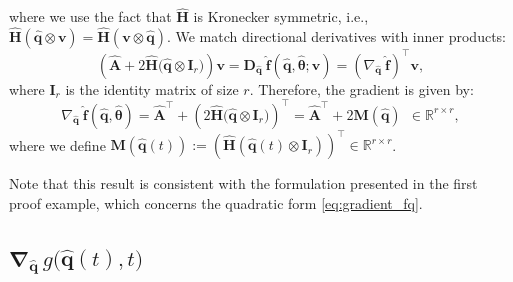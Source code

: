 where we use the fact that $\hat{\mathbf{H}}$ is Kronecker symmetric, i.e., $\hat{\mathbf{H}}(\hat{\mathbf{q}} \otimes \mathbf{v}) = \hat{\mathbf{H}}(\mathbf{v} \otimes \hat{\mathbf{q}})$.
We match directional derivatives with inner products:\\
$$
\left( \hat{\mathbf{A}} + 2\hat{\mathbf{H}}\bigl( \hat{\mathbf{q}} \otimes \mathbf{I}_r \bigr) \right) \mathbf{v} = \bm{D}_{\hat{\mathbf{q}}}~\hat{\mathbf{f}}(\hat{\mathbf{q}},\hat{\bm{\theta}};\mathbf{v}) = \left( \nabla_{\hat{\mathbf{q}}}~\hat{\mathbf{f}} \right)^{\top}  \mathbf{v},
$$
where $\mathbf{I}_r$ is the identity matrix of size $r$. Therefore, the gradient is given by:\\
\begin{equation}
    \nabla_{\hat{\mathbf{q}}}~\hat{\mathbf{f}}(\hat{\mathbf{q}}, \hat{\bm{\theta}}) = \hat{\mathbf{A}}^{\top} + \left( 2\hat{\mathbf{H}}\bigl( \hat{\mathbf{q}} \otimes \mathbf{I}_r \bigr) \right)^{\top} = \hat{\mathbf{A}}^{\top} + 2\mathbf{M}(\hat{\mathbf{q}}) ~~ \in \mathbb{R}^{r \times r},
    \label{eq:gradient_1}
\end{equation}
where we define $\mathbf{M}(\hat{\mathbf{q}}(t)) := \left( \hat{\mathbf{H}}( \hat{\mathbf{q}}(t) \otimes \mathbf{I}_r ) \right)^{\top} \in \mathbb{R}^{r \times r}$.

Note that this result is consistent with the formulation presented in the first proof example, which concerns the quadratic form \eqref{eq:gradient_fq}.


\subsection{$\bm{\nabla}_{\hat{\mathbf{q}}}\,g\bigl(\hat{\mathbf{q}}(t),t\bigr)$}

